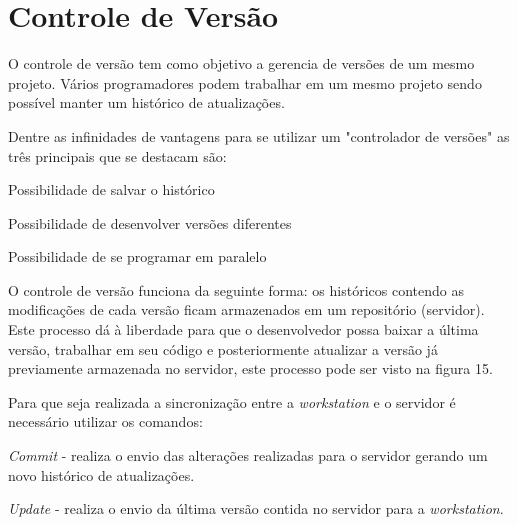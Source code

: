 \section{Controle de Versão}
\label{sec:Controle-de-Versão}

O controle de versão tem como objetivo a gerencia de versões de um mesmo projeto. Vários programadores podem trabalhar em um mesmo projeto sendo possível manter um histórico de atualizações.

Dentre as infinidades de vantagens para se utilizar um "controlador de versões" as três principais que se destacam são:
\begin{alineascomponto}
	
   \item Possibilidade de salvar o histórico
   \item Possibilidade de desenvolver versões diferentes
   \item Possibilidade de se programar em paralelo

	\end{alineascomponto}
	
	
O controle de versão funciona da seguinte forma: os históricos contendo as modificações de cada versão ficam armazenados em um repositório (servidor). Este processo dá à liberdade para que o desenvolvedor possa baixar a última versão, trabalhar em seu código e posteriormente atualizar a versão já previamente armazenada no servidor, este processo pode ser visto na figura 15.

	\begin{figure}[h!]
		\centering
	\end{figure}
	
	Para que seja realizada a sincronização entre a \textit{workstation} e o servidor é necessário utilizar os comandos:
	
	\begin{alineascomponto}
\item \textit{Commit} - realiza o envio das alterações realizadas para o servidor gerando um novo histórico de atualizações.
\item \textit{Update} - realiza o envio da última versão contida no servidor para a \textit{workstation}.

	\end{alineascomponto}
	
